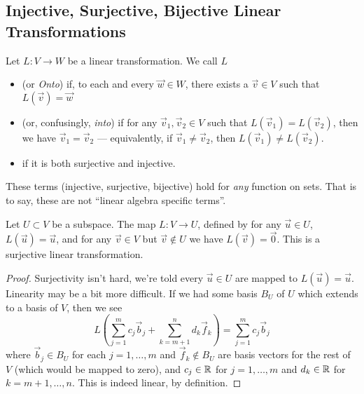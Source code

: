 \subsection{Injective, Surjective, Bijective Linear Transformations}

\begin{definition}
  Let $L\colon V\to W$ be a linear transformation. We call $L$
  \begin{itemize}
  \item {} (or \emph{Onto}) if, to each and every $\vec{w}\in W$,
    there exists a $\vec{v}\in V$ such that $L(\vec{v})=\vec{w}$
  \item {} (or, confusingly, \emph{into}) if for any
    $\vec{v}_{1},\vec{v}_{2}\in V$ such that
    $L(\vec{v}_{1})=L(\vec{v}_{2})$, then we have
    $\vec{v}_{1}=\vec{v}_{2}$ --- equivalently, if
    $\vec{v}_{1}\neq\vec{v}_{2}$, then $L(\vec{v}_{1})\neq L(\vec{v}_{2})$.
  \item {} if it is both surjective and injective.
  \end{itemize}
\end{definition}

\begin{remark}
These terms (injective, surjective, bijective) hold for \emph{any}
function on sets. That is to say, these are not ``linear algebra
specific terms''.
\end{remark}

\begin{example}
Let $U\subset V$ be a subspace. The map $L\colon V\to U$, defined by for
any $\vec{u}\in U$, $L(\vec{u})=\vec{u}$, and for any $\vec{v}\in V$ but
$\vec{v}\notin U$ we have $L(\vec{v})=\vec{0}$. This is a surjective
linear transformation.

\begin{proof}
Surjectivity isn't hard, we're told every $\vec{u}\in U$ are mapped to
$L(\vec{u})=\vec{u}$. Linearity may be a bit more difficult. If we had
some basis $B_{U}$ of $U$ which extends to a basis of $V$, then we see
\begin{equation}
L(\sum_{j=1}^{m}c_{j}\vec{b}_{j} + \sum_{k=m+1}^{n}d_{k}\vec{f}_{k}) = \sum^{m}_{j=1}c_{j}\vec{b}_{j}
\end{equation}
where $\vec{b}_{j}\in B_{U}$ for each $j=1,\dots,m$ and
$\vec{f}_{k}\notin B_{U}$ are basis vectors for the rest of $V$ (which
would be mapped to zero), and $c_{j}\in\mathbb{R}$ for $j=1,\dots,m$ and
$d_{k}\in\mathbb{R}$ for $k=m+1,\dots,n$. This is indeed linear, by definition.
\end{proof}
\end{example}

